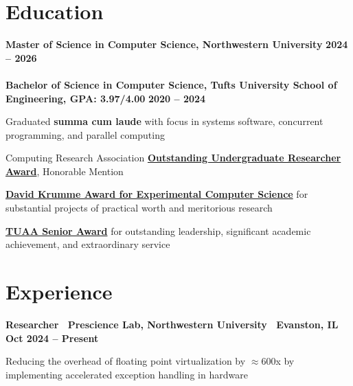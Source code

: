 \documentclass[10pt]{article}
\newenvironment{mylist}[1][]
{\itemize[nosep, wide=0pt, leftmargin=*, after=\strut]}
{\enditemize}
\begin{document}
\section{Education}
\begin{minipage}[t]{\linewidth}
    \textbf{Master of Science in Computer Science, Northwestern University } \hfill \textbf{2024 -- 2026} \\
    \vspace{-0.25cm} \\
    \textbf{Bachelor of Science in Computer Science, Tufts University School of Engineering, GPA: 3.97/4.00} \hfill \textbf{2020 -- 2024}
    \small \begin{mylist}
        \item Graduated \textbf{summa cum laude} with focus in systems software, concurrent programming, and parallel computing
        \item Computing Research Association \href{https://engineering.tufts.edu/cs/research/undergraduate-research/undergrad-research-award-nominees}{\textbf{Outstanding Undergraduate Researcher Award}}, Honorable Mention
        \item \href{https://engineering.tufts.edu/cs/news-events/awards}{\textbf{David Krumme Award for Experimental Computer Science}} for substantial projects of practical worth and meritorious research
        \item \href{https://alumniandfriends.tufts.edu/2024-senior-awardee-liam-strand-e24}{\textbf{TUAA Senior Award}} for outstanding leadership, significant academic achievement, and extraordinary service
    \end{mylist}

\end{minipage}


\section{Experience}
\begin{minipage}[t]{\linewidth}
    \textbf{Researcher \textbar \ Prescience Lab, Northwestern University \textbar \ Evanston, IL} \hfill \textbf{Oct 2024 -- Present} 
    \begin{mylist}
        \item Reducing the overhead of floating point virtualization by $\approx$600x by implementing accelerated exception handling in hardware
    \end{mylist}
\end{minipage}
\end{document}
